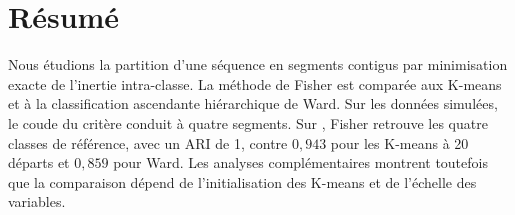 \section*{Résumé}
Nous étudions la partition d'une séquence en segments contigus par minimisation
exacte de l'inertie intra-classe. La méthode de Fisher est comparée aux K-means
et à la classification ascendante hiérarchique de Ward. Sur les données simulées,
le coude du critère conduit à quatre segments. Sur , Fisher
retrouve les quatre classes de référence, avec un ARI de 1, contre $0{,}943$
pour les K-means à 20 départs et $0{,}859$ pour Ward. Les analyses
complémentaires montrent toutefois que la comparaison dépend de l'initialisation
des K-means et de l'échelle des variables.
